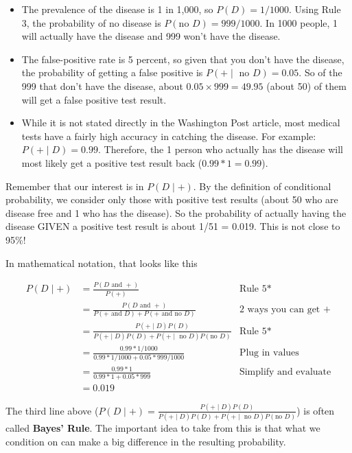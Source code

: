 \documentclass[
]{book}
\begin{document}
\begin{itemize}
\item
  The prevalence of the disease is 1 in 1,000, so \(P(D) = 1/1000\). Using Rule 3, the probability of no disease is \(P(\text{no }D) = 999/1000\). In 1000 people, 1 will actually have the disease and 999 won't have the disease.
\item
  The false-positive rate is 5 percent, so given that you don't have the disease, the probability of getting a false positive is \(P(+ \mid\text{ no } D) = 0.05\). So of the 999 that don't have the disease, about \(0.05\times 999 = 49.95\) (about 50) of them will get a false positive test result.
\item
  While it is not stated directly in the Washington Post article, most medical tests have a fairly high accuracy in catching the disease. For example: \(P(+ \mid D) = 0.99\). Therefore, the 1 person who actually has the disease will most likely get a positive test result back (\(0.99*1 = 0.99\)).
\end{itemize}

Remember that our interest is in \(P(D \mid +)\). By the definition of conditional probability, we consider only those with positive test results (about 50 who are disease free and 1 who has the disease). So the probability of actually having the disease GIVEN a positive test result is about 1/51 = 0.019. This is not close to 95\%!

In mathematical notation, that looks like this

\begin{align*}
P(D \mid +) &= \frac{P(D \text{ and } +)}{P(+)} &\text{Rule 5*}\\
&= \frac{P(D \text{ and } +)}{P(+ \text{ and } D) + P(+ \text{ and no } D)} &\text{2 ways you can get +}\\
&= \frac{P(+ \mid D) P(D)}{P( + \mid D) P(D) + P( + \mid \text{ no }D) P(\text{no }D)} &\text{Rule 5*}\\
&= \frac{0.99*1/1000}{0.99*1/1000 + 0.05*999/1000} &\text{Plug in values}\\
&= \frac{0.99*1}{0.99*1 + 0.05*999} &\text{Simplify and evaluate}\\
&= 0.019
\end{align*}

The third line above (\(P(D \mid +) = \frac{P(+ \mid D) P(D)}{P( + \mid D) P(D) + P( + \mid \text{ no }D) P(\text{no }D)}\)) is often called \textbf{Bayes' Rule}. The important idea to take from this is that what we condition on can make a big difference in the resulting probability.
\end{document}
